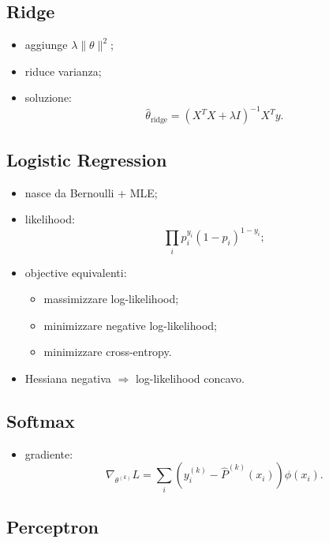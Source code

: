 \documentclass{article}
\providecommand{\tightlist}{%
  \setlength{\itemsep}{0pt}\setlength{\parskip}{0pt}}
\begin{document}
\subsection{Ridge}\label{ridge}

\begin{itemize}
\tightlist
\item
  aggiunge \(\lambda\|\theta\|^2\);
\item
  riduce varianza;
\item
  soluzione: \[
  \hat\theta_{\text{ridge}}=(X^TX+\lambda I)^{-1}X^Ty.
  \]
\end{itemize}

\subsection{Logistic Regression}\label{logistic-regression}

\begin{itemize}
\tightlist
\item
  nasce da Bernoulli + MLE;
\item
  likelihood: \[
  \prod_i p_i^{y_i}(1-p_i)^{1-y_i};
  \]
\item
  objective equivalenti:

  \begin{itemize}
  \tightlist
  \item
    massimizzare log-likelihood;
  \item
    minimizzare negative log-likelihood;
  \item
    minimizzare cross-entropy.
  \end{itemize}
\item
  Hessiana negativa \(\Rightarrow\) log-likelihood concavo.
\end{itemize}

\subsection{Softmax}\label{softmax}

\begin{itemize}
\tightlist
\item
  gradiente: \[
  \nabla_{\theta^{(k)}}L
  =
  \sum_i (y_i^{(k)}-\hat P^{(k)}(x_i))\phi(x_i).
  \]
\end{itemize}

\subsection{Perceptron}\label{perceptron}
\end{document}
